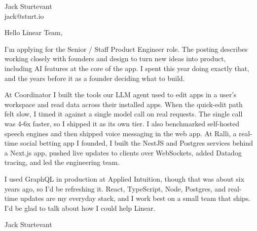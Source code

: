 \documentclass[11pt]{article}
\begin{document}
\raggedright

{\namefont\fontsize{20pt}{24pt}\selectfont Jack Sturtevant}\\[-0.3em]
jack@sturt.io

\vspace{1.2em}

Hello Linear Team,

I'm applying for the Senior / Staff Product Engineer role. The posting describes working closely with founders and design to turn new ideas into product, including AI features at the core of the app. I spent this year doing exactly that, and the years before it as a founder deciding what to build.

At Coordinator I built the tools our LLM agent used to edit apps in a user's workspace and read data across their installed apps. When the quick-edit path felt slow, I timed it against a single model call on real requests. The single call was 4-6x faster, so I shipped it as its own tier. I also benchmarked self-hosted speech engines and then shipped voice messaging in the web app. At Ralli, a real-time social betting app I founded, I built the NestJS and Postgres services behind a Next.js app, pushed live updates to clients over WebSockets, added Datadog tracing, and led the engineering team.

I used GraphQL in production at Applied Intuition, though that was about six years ago, so I'd be refreshing it. React, TypeScript, Node, Postgres, and real-time updates are my everyday stack, and I work best on a small team that ships. I'd be glad to talk about how I could help Linear.

\vspace{0.6em}
Jack Sturtevant
\end{document}
